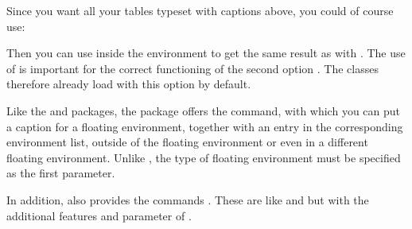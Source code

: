 \begin{Example}
\begin{ShowOutput}
\begin{tabular}{llll}
    \end{tabular}
  \end{ShowOutput}
  Since you want all your tables typeset with captions above, you could of
  course use:
\begin{lstcode}
  \usepackage[enablepatch=caption,tablecaptionabove]{tocbasic}
\end{lstcode}
  Then you can use  inside the  environment
  to get the same result as with . The use of
   is important for the
  correct functioning of the second option
  . The \KOMAScript{} classes
  therefore already load  with this option by default.%
\end{Example}
\EndIndexGroup
\ExampleEndFix

\begin{Declaration}
\end{Declaration}%
Like the  and
 packages, the 
package offers the  command, with which you can put a caption
for a floating environment, together with an entry in the corresponding
environment list, outside of the floating environment or even in a different
floating environment. Unlike , the type of
floating environment must be specified as the first parameter.

In addition,  also provides the commands
. These are like 
and  but with the additional features and
parameter of .

